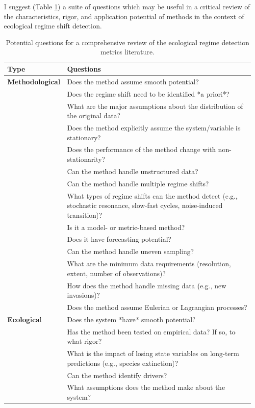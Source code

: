 \documentclass[12pt,twoside,openany]{reedthesis}
\begin{document}
I suggest (Table \ref{tab:nextStepsTab}) a suite of questions which may be useful in a critical review of the characteristics, rigor, and application potential of methods in the context of ecological regime shift detection.
\begin{longtable}{>{\bfseries}l|>{\raggedright\arraybackslash}p{30em}}
\caption{\label{tab:nextStepsTab}Potential questions for a comprehensive review of the ecological regime detection metrics literature.}\\
\toprule
Type & Questions\\
\midrule
Methodological & Does the method assume smooth potential?\\
 & Does the regime shift need to be identified *a priori*?\\
 & What are the major assumptions about the distribution of the original data?\\
 & Does the method explicitly assume the system/variable is stationary?\\
 & Does the performance of the method change with non-stationarity?\\
\addlinespace
 & Can the method handle unstructured data?\\
 & Can the method handle multiple regime shifts?\\
 & What types of regime shifts can the method detect (e.g., stochastic resonance, slow-fast cycles, noise-induced transition)?\\
 & Is it a model- or metric-based method?\\
 & Does it have forecasting potential?\\
\addlinespace
 & Can the method handle uneven sampling?\\
 & What are the minimum data requirements (resolution, extent, number of observations)?\\
 & How does the method handle missing data (e.g., new invasions)?\\
 & Does the method assume Eulerian or Lagrangian processes?\\
Ecological & Does the system *have* smooth potential?\\
\addlinespace
 & Has the method been tested on empirical data? If so, to what rigor?\\
 & What is the impact of losing state variables on long-term predictions (e.g., species extinction)?\\
 & Can the method identify drivers?\\
 & What assumptions does the method make about the system?\\

\end{longtable}
\end{document}
